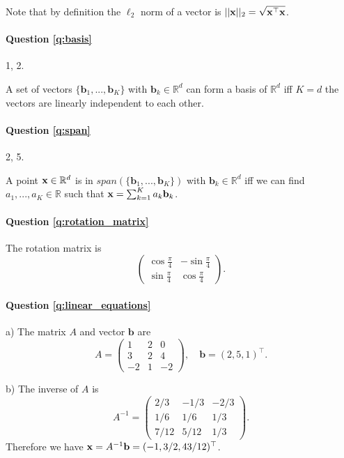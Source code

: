 Note that by definition the $\ell_2$ norm of a vector is $|| \mathbf{x} ||_2 = \sqrt{\mathbf{x}^\top \mathbf{x}}$.

\paragraph{Question \ref{q:basis}} 1, 2. 

A set of vectors $\{\mathbf{b}_1, ..., \mathbf{b}_K \}$ with $\mathbf{b}_k \in \mathbb{R}^d$ can form a basis of $\mathbb{R}^d$ iff $K = d$ the vectors are linearly independent to each other.

\paragraph{Question \ref{q:span}} 2, 5. 

A point $\mathbf{x} \in \mathbb{R}^d$ is in $span(\{\mathbf{b}_1, ..., \mathbf{b}_K \})$ with $\mathbf{b}_k \in \mathbb{R}^d$ iff we can find $a_1, ..., a_K \in \mathbb{R}$ such that $\mathbf{x} = \sum_{k=1}^K a_k \mathbf{b}_k$.

\paragraph{Question \ref{q:rotation_matrix}} The rotation matrix is 
\begin{equation*}
    \begin{pmatrix}
    \cos{\frac{\pi}{4}} & -\sin{\frac{\pi}{4}} \\
    \sin{\frac{\pi}{4}} & \cos{\frac{\pi}{4}}
    \end{pmatrix}.
\end{equation*}

\paragraph{Question \ref{q:linear_equations}}

a) The matrix $A$ and vector $\mathbf{b}$ are
\begin{equation*}
A = \begin{pmatrix}
1 & 2 & 0 \\
3 & 2 & 4 \\
-2 & 1 & -2
\end{pmatrix}, \quad \mathbf{b} = (2, 5, 1)^\top.
\end{equation*}

b) The inverse of $A$ is 
\begin{equation*}
A^{-1} = \begin{pmatrix}
2/3 & -1/3 & -2/3 \\
1/6 & 1/6 & 1/3 \\
7/12 & 5/12 & 1/3
\end{pmatrix}.
\end{equation*}
Therefore we have $\mathbf{x} = A^{-1} \mathbf{b} = (-1, 3/2, 43/12)^\top$.

